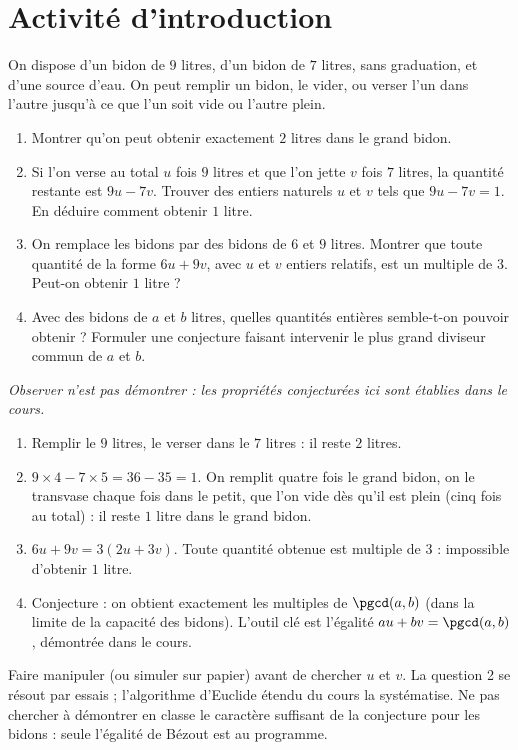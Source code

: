\mxnewpage
\section{Activité d'introduction}
\begin{activity}
On dispose d'un bidon de $9$ litres, d'un bidon de $7$ litres, sans graduation, et d'une source d'eau. On peut remplir un bidon, le vider, ou verser l'un dans l'autre jusqu'à ce que l'un soit vide ou l'autre plein.
\begin{enumerate}
\item Montrer qu'on peut obtenir exactement $2$ litres dans le grand bidon.
\item Si l'on verse au total $u$ fois $9$ litres et que l'on jette $v$ fois $7$ litres, la quantité restante est $9u-7v$. Trouver des entiers naturels $u$ et $v$ tels que $9u-7v=1$. En déduire comment obtenir $1$ litre.
\item On remplace les bidons par des bidons de $6$ et $9$ litres. Montrer que toute quantité de la forme $6u+9v$, avec $u$ et $v$ entiers relatifs, est un multiple de $3$. Peut-on obtenir $1$ litre ?
\item Avec des bidons de $a$ et $b$ litres, quelles quantités entières semble-t-on pouvoir obtenir ? Formuler une conjecture faisant intervenir le plus grand diviseur commun de $a$ et $b$.
\end{enumerate}
\par\emph{Observer n'est pas démontrer : les propriétés conjecturées ici sont établies dans le cours.}
\end{activity}
\begin{solution}[Activité]
\begin{enumerate}
\item Remplir le $9$ litres, le verser dans le $7$ litres : il reste $2$ litres.
\item $9\times4-7\times5=36-35=1$. On remplit quatre fois le grand bidon, on le transvase chaque fois dans le petit, que l'on vide dès qu'il est plein (cinq fois au total) : il reste $1$ litre dans le grand bidon.
\item $6u+9v=3(2u+3v)$. Toute quantité obtenue est multiple de $3$ : impossible d'obtenir $1$ litre.
\item Conjecture : on obtient exactement les multiples de $\pgcd(a,b)$ (dans la limite de la capacité des bidons). L'outil clé est l'égalité $au+bv=\pgcd(a,b)$, démontrée dans le cours.
\end{enumerate}
\end{solution}
\begin{teachernote}
Faire manipuler (ou simuler sur papier) avant de chercher $u$ et $v$. La question 2 se résout par essais ; l'algorithme d'Euclide étendu du cours la systématise. Ne pas chercher à démontrer en classe le caractère suffisant de la conjecture pour les bidons : seule l'égalité de Bézout est au programme.
\end{teachernote}

